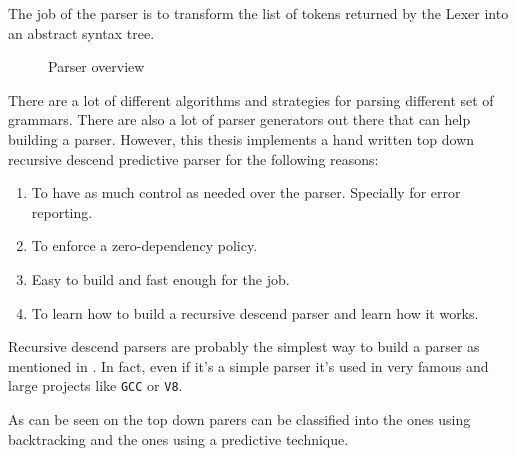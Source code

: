 The job of the parser is to transform the list of tokens returned by the Lexer into an abstract syntax tree.\\

\begin{figure}[H]
    \centering

    \caption{Parser overview}
    \label{fig:parser_overview}
\end{figure}

There are a lot of different algorithms and strategies for parsing different set of grammars.
There are also a lot of parser generators out there that can help building a parser. However, this thesis implements
a hand written top down recursive descend predictive parser for the following reasons:

\begin{enumerate}
    \item To have as much control as needed over the parser. Specially for error reporting.
    \item To enforce a zero-dependency policy.
    \item Easy to build and fast enough for the job.
    \item To learn how to build a recursive descend parser and learn how it works.
\end{enumerate}

Recursive descend parsers are probably the simplest way to build a parser as mentioned in \autocite[Section~6]{crafting_interpreters}.
In fact, even if it's a simple parser it's used in very famous and large projects like \texttt{GCC} or \texttt{V8}.

As can be seen on \autocite{top_down_parsing} the top down parers can be classified into the ones using backtracking and the ones using a predictive technique.

